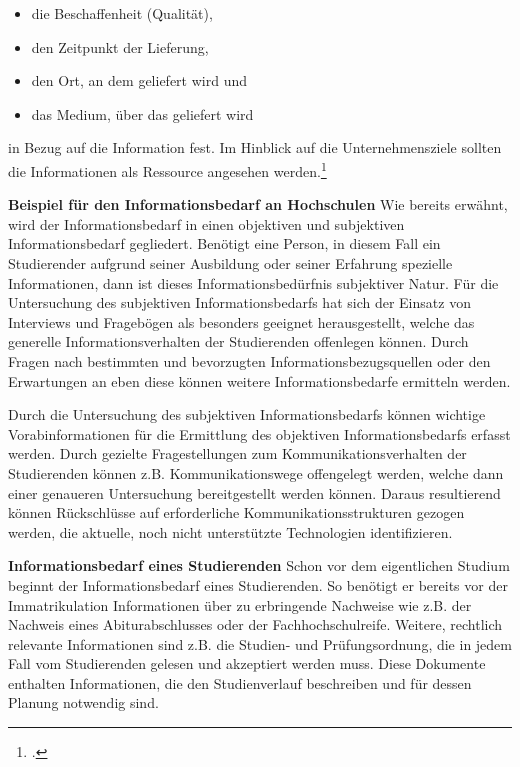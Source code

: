\begin{itemize}
	\item die Beschaffenheit (Qualität),
	\item den Zeitpunkt der Lieferung,
	\item den Ort, an dem geliefert wird und
	\item das Medium, über das geliefert wird		 
\end{itemize}
in Bezug auf die Information fest. Im Hinblick auf die Unternehmensziele sollten die Informationen als Ressource angesehen werden.\footcite[Vgl. u.a.][]{bode_informationsbegriff_1997}

\textbf{Beispiel für den Informationsbedarf an Hochschulen}
Wie bereits erwähnt, wird der Informationsbedarf in einen objektiven und subjektiven Informationsbedarf gegliedert. Benötigt eine Person, in diesem Fall ein Studierender aufgrund seiner Ausbildung oder seiner Erfahrung spezielle Informationen, dann ist dieses Informationsbedürfnis subjektiver Natur. 
Für die Untersuchung des subjektiven Informationsbedarfs hat sich der Einsatz von Interviews und Fragebögen als besonders geeignet herausgestellt, welche das generelle Informationsverhalten der Studierenden offenlegen können. Durch Fragen nach bestimmten und bevorzugten Informationsbezugsquellen oder den Erwartungen an eben diese können weitere Informationsbedarfe ermitteln werden.

Durch die Untersuchung des subjektiven Informationsbedarfs können wichtige Vorabinformationen für die Ermittlung des objektiven Informationsbedarfs erfasst werden. Durch gezielte Fragestellungen zum Kommunikationsverhalten der Studierenden können z.B. Kommunikationswege offengelegt werden, welche dann einer genaueren Untersuchung bereitgestellt werden können. Daraus resultierend können Rückschlüsse auf erforderliche Kommunikationsstrukturen gezogen werden, die aktuelle, noch nicht unterstützte Technologien identifizieren. 

\textbf{Informationsbedarf eines Studierenden}
Schon vor dem eigentlichen Studium beginnt der Informationsbedarf  eines Studierenden. So benötigt er bereits vor der Immatrikulation Informationen über zu erbringende Nachweise wie z.B. der Nachweis eines Abiturabschlusses oder der Fachhochschulreife. Weitere, rechtlich relevante Informationen sind z.B. die Studien- und Prüfungsordnung, die in jedem Fall vom Studierenden gelesen und akzeptiert werden muss. Diese Dokumente enthalten Informationen, die den Studienverlauf beschreiben und für dessen Planung notwendig sind.

